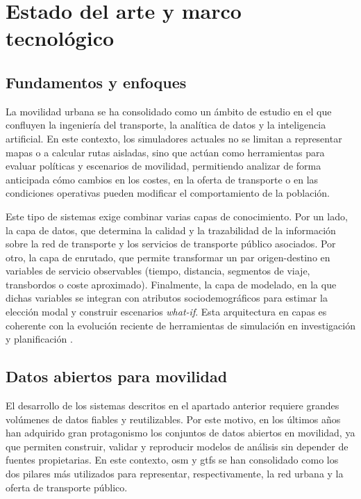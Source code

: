 \chapter{Estado del arte y marco tecnológico}
\label{ch:estadoarte}

\section{Fundamentos y enfoques}

La movilidad urbana se ha consolidado como un ámbito de estudio en el que confluyen la ingeniería del transporte, la analítica de datos y la inteligencia artificial. En este contexto, los simuladores actuales no se limitan a representar mapas o a calcular rutas aisladas, sino que actúan como herramientas para evaluar políticas y escenarios de movilidad, permitiendo analizar de forma anticipada cómo cambios en los costes, en la oferta de transporte o en las condiciones operativas pueden modificar el comportamiento de la población.\newline

Este tipo de sistemas exige combinar varias capas de conocimiento. Por un lado, la capa de datos, que determina la calidad y la trazabilidad de la información sobre la red de transporte y los servicios de transporte público asociados. Por otro, la capa de enrutado, que permite transformar un par origen-destino en variables de servicio observables (tiempo, distancia, segmentos de viaje, transbordos o coste aproximado). Finalmente, la capa de modelado, en la que dichas variables se integran con atributos sociodemográficos para estimar la elección modal y construir escenarios \textit{what-if}. Esta arquitectura en capas es coherente con la evolución reciente de herramientas de simulación en investigación y planificación \cite{Horni2016MATSim,Lopez2018SUMO}.

\newpage
\section{Datos abiertos para movilidad}

El desarrollo de los sistemas descritos en el apartado anterior requiere grandes volúmenes de datos fiables y reutilizables. Por este motivo, en los últimos años han adquirido gran protagonismo los conjuntos de datos abiertos en movilidad, ya que permiten construir, validar y reproducir modelos de análisis sin depender de fuentes propietarias. En este contexto, \acrlong{osm} y \acrshort{gtfs} se han consolidado como los dos pilares más utilizados para representar, respectivamente, la red urbana y la oferta de transporte público.

